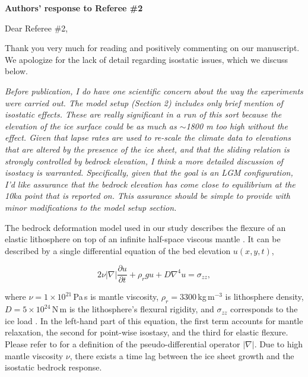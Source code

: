 \documentclass[10pt]{article}
\begin{document}
\textbf{Authors' response to Referee {\#}2}
\bigskip


\def\doi#1{doi:\allowbreak\href{http://dx.doi.org/#1}{#1}}
\def\referee#1{\bigskip\textcolor{journalname}{\textit{#1}}}

Dear Referee {\#}2,

Thank you very much for reading and positively commenting on our manuscript. We apologize for the lack of detail regarding isostatic issues, which we discuss below.

\referee{Before publication, I do have one scientific concern about the way the experiments were carried out. The model setup (Section 2) includes only brief mention of isostatic effects. These are really significant in a run of this sort because the elevation of the ice surface could be as much as $\sim$1800 m too high without the effect. Given that lapse rates are used to re-scale the climate data to elevations that are altered by the presence of the ice sheet, and that the sliding relation is strongly controlled by bedrock elevation, I think a more detailed discussion of isostacy is warranted. Specifically, given that the goal is an LGM configuration, I'd like assurance that the bedrock elevation has come close to equilibrium at the 10ka point that is reported on. This assurance should be simple to provide with minor modifications to the model setup section.}

The bedrock deformation model used in our study describes the flexure of an elastic lithosphere on top of an infinite half-space viscous mantle \citep{lingle-clark-1985}. It can be described by a single differential equation of the bed elevation $u(x, y, t)$,

\begin{equation}
    2 \nu |\nabla| \frac{\partial u}{\partial t}
    + \rho_r g u
    + D \nabla^4 u
    = \sigma_{zz},
\end{equation}

where $\nu=1\times10^{21}$\,Pa\,s is mantle viscosity, $\rho_r = 3300$\,kg\,m$^{-3}$ is lithosphere density, $D=5\times10^{24}$\,N\,m is the lithosphere's flexural rigidity, and $\sigma_{zz}$ corresponds to the ice load \citet{bueler-etal-2007}. In the left-hand part of this equation, the first term accounts for mantle relaxation, the second for point-wise isostasy, and the third for elastic flexure. Please refer to \citet{bueler-etal-2007} for a definition of the pseudo-differential operator $|\nabla|$. Due to high mantle viscosity $\nu$, there exists a time lag between the ice sheet growth and the isostatic bedrock response.
\end{document}
